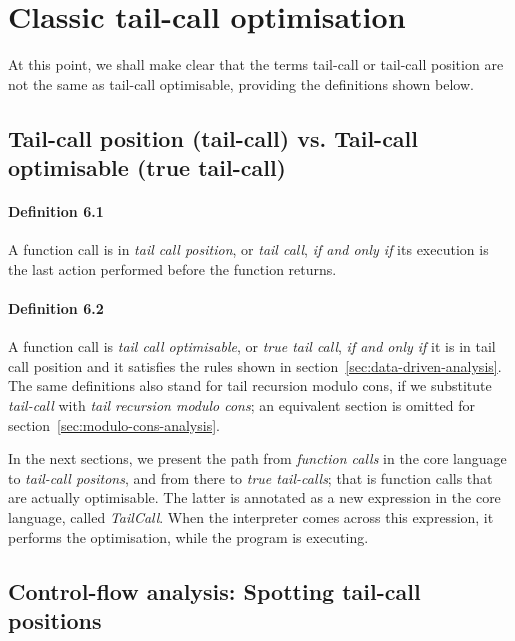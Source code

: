 \documentclass[diploma]{softlab-thesis}
\begin{document}

\section{Classic tail-call optimisation}
\label{sec:classic-tco-analysis}

At this point, we shall make clear that the terms tail-call or tail-call position are not the same 
as tail-call optimisable, providing the definitions shown below.

\subsection{Tail-call position (tail-call) vs. Tail-call optimisable (true tail-call)}

\paragraph{Definition 6.1}
A function call is in \textit{tail call position}, or \textit{tail call}, \textit{if and only if} its execution is the last action 
performed before the function returns.

\paragraph{Definition 6.2}
A function call is \textit{tail call optimisable}, or \textit{true tail call}, \textit{if and only if} it is in tail call position and it satisfies the rules shown in 
section~\ref{sec:data-driven-analysis}.\\

The same definitions also stand for tail recursion modulo cons, if we substitute \textit{tail-call} with 
\textit{tail recursion modulo cons}; an equivalent section is omitted for section~\ref{sec:modulo-cons-analysis}.

In the next sections, we present the path from \textit{function calls} in the core language to \textit{tail-call positons}, 
and from there to \textit{true tail-calls}; that is function calls that are actually optimisable. The latter is annotated as a new 
expression in the core language, called \textit{TailCall}. When the interpreter comes across this expression, it performs the 
optimisation, while the program is executing.

\subsection{Control-flow analysis: Spotting tail-call positions}
\label{sec:control-flow}
\end{document}
